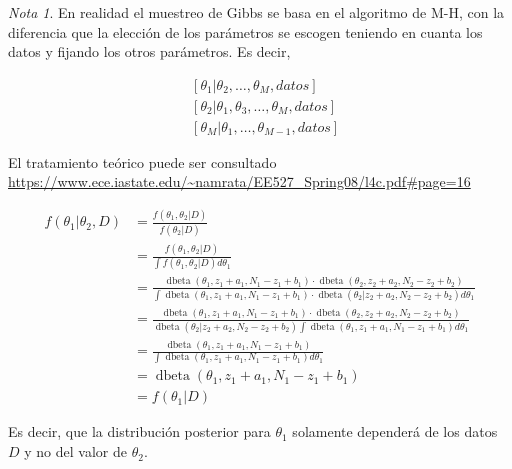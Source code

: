 \documentclass[
  12pt,
]{book}
\theoremstyle{definition}
\theoremstyle{definition}
\theoremstyle{definition}
\theoremstyle{definition}
\theoremstyle{remark}
\newtheorem*{remark}{Nota}
\begin{document}
\begin{remark}
En realidad el muestreo de Gibbs se basa en el algoritmo de M-H, con la diferencia que la elección de los parámetros se escogen teniendo en cuanta los datos y fijando los otros parámetros. Es decir,

\begin{align*}
&{\left[\theta_{1} | \theta_{2}, \ldots, \theta_{M}, datos \right]} \\
&{\left[\theta_{2} | \theta_{1}, \theta_{3}, \ldots, \theta_{M}, datos \right]} \\
&{\left[\theta_{M} | \theta_{1}, \ldots, \theta_{M-1}, datos \right]}
\end{align*}
\end{remark}

El tratamiento teórico puede ser consultado \url{https://www.ece.iastate.edu/~namrata/EE527_Spring08/l4c.pdf\#page=16}

\begin{align*}
f\left(\theta_{1} | \theta_{2}, D\right) 
&= \frac{f\left(\theta_{1}, \theta_{2} | D\right)}{f\left(\theta_{2} | D\right)}  \\
&= \frac{f\left(\theta_{1}, \theta_{2} | D\right)}{\int f\left(\theta_{1}, \theta_{2} | D\right)d \theta_{1}}   \\
&=\frac{\operatorname{dbeta}\left(\theta_{1}, z_{1}+a_{1}, N_{1}-z_{1}+b_{1}\right) \cdot \operatorname{dbeta}\left(\theta_{2}, z_{2}+a_{2}, N_{2}-z_{2}+b_{2}\right)}{\int  \operatorname{dbeta}\left(\theta_{1}, z_{1}+a_{1}, N_{1}-z_{1}+b_{1}\right) \cdot \operatorname{dbeta}\left(\theta_{2} | z_{2}+a_{2}, N_{2}-z_{2}+b_{2}\right)d \theta_{1}} \\
&=\frac{\operatorname{dbeta}\left(\theta_{1}, z_{1}+a_{1}, N_{1}-z_{1}+b_{1}\right) \cdot \operatorname{dbeta}\left(\theta_{2}, z_{2}+a_{2}, N_{2}-z_{2}+b_{2}\right)}{\operatorname{dbeta}\left(\theta_{2} | z_{2}+a_{2}, N_{2}-z_{2}+b_{2}\right) \int  \operatorname{dbeta}\left(\theta_{1}, z_{1}+a_{1}, N_{1}-z_{1}+b_{1}\right)d \theta_{1}} \\
&=\frac{\operatorname{dbeta}\left(\theta_{1}, z_{1}+a_{1}, N_{1}-z_{1}+b_{1}\right)}{\int  \operatorname{dbeta}\left(\theta_{1}, z_{1}+a_{1}, N_{1}-z_{1}+b_{1}\right)d \theta_{1}} \\
&=\operatorname{dbeta}\left(\theta_{1}, z_{1}+a_{1}, N_{1}-z_{1}+b_{1}\right) \\
&= f(\theta_1 | D)
\end{align*}

Es decir, que la distribución posterior para \(\theta_1\) solamente dependerá de los datos \(D\) y no del valor de \(\theta_2\).
\end{document}
